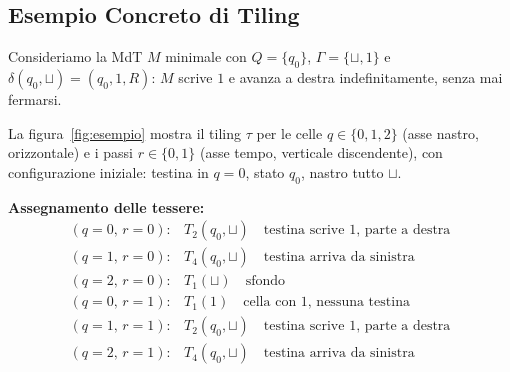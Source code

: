 \documentclass[12pt, a4paper]{article}
\newcommand{\blank}{\sqcup}
\begin{document}
\subsection{Esempio Concreto di Tiling}

Consideriamo la MdT $M$ minimale con $Q = \{q_0\}$, $\Gamma = \{\blank, 1\}$ e
$\delta(q_0, \blank) = (q_0, 1, R)$: $M$ scrive $1$ e avanza a destra indefinitamente,
senza mai fermarsi.

La figura~\ref{fig:esempio} mostra il tiling $\tau$ per le celle $q \in \{0,1,2\}$
(asse nastro, orizzontale) e i passi $r \in \{0, 1\}$ (asse tempo, verticale discendente),
con configurazione iniziale: testina in $q=0$, stato $q_0$, nastro tutto $\blank$.

\medskip

\noindent\textbf{Assegnamento delle tessere:}
\[
\begin{array}{ll}
(q{=}0,\,r{=}0): & T_2(q_0, \blank) \quad \text{testina scrive } 1 \text{, parte a destra} \\
(q{=}1,\,r{=}0): & T_4(q_0, \blank) \quad \text{testina arriva da sinistra} \\
(q{=}2,\,r{=}0): & T_1(\blank) \quad \text{sfondo} \\
(q{=}0,\,r{=}1): & T_1(1) \quad \text{cella con } 1 \text{, nessuna testina} \\
(q{=}1,\,r{=}1): & T_2(q_0, \blank) \quad \text{testina scrive } 1 \text{, parte a destra} \\
(q{=}2,\,r{=}1): & T_4(q_0, \blank) \quad \text{testina arriva da sinistra}
\end{array}
\]
\end{document}
